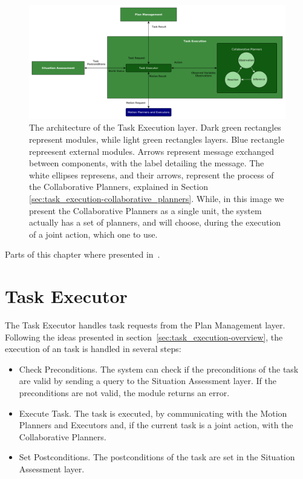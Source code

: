 \begin{figure}[h!]
	\centering
	\includegraphics[clip,scale=0.38]{img/coworker/task_execution/architecture.pdf}
	\caption[The architecture of the Task Execution layer]{The architecture of the Task Execution  layer. Dark green rectangles represent modules, while light green rectangles layers. Blue rectangle repreesent external modules. Arrows represent message exchanged between components, with the label detailing the message. The white ellipses represens, and their arrows, represent the process of the Collaborative Planners, explained in Section \ref{sec:task_execution-collaborative_planners}. While, in this image we present the Collaborative Planners as a single unit, the system actually has a set of planners, and will choose, during the execution of a joint action, which one to use.}
	\label{fig:task_execution:architecture}
\end{figure}


Parts of this chapter where presented in~\cite{fioreiser2014}.

\section{Task Executor}
\label{sec:task_execution-action_executor}
The Task Executor handles task requests from the Plan Management layer. Following the ideas presented in section~\ref{sec:task_execution-overview}, the execution of an task is handled in several steps:
\begin{itemize}
\item Check Preconditions. The system can check if the preconditions of the task are valid by sending a query to the Situation Assessment layer. If the preconditions are not valid, the module returns an error.
\item Execute Task. The task is executed, by communicating with the Motion Planners and Executors and, if the current task is a joint action, with the Collaborative Planners.
\item Set Postconditions. The postconditions of the task are set in the Situation Assessment layer.
\end{itemize}

